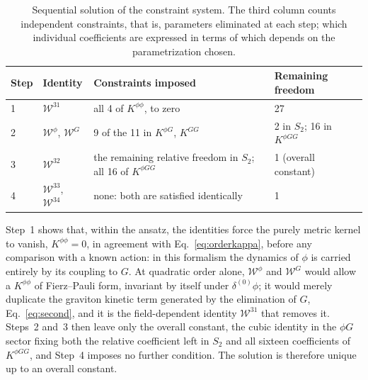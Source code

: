 \documentclass[prd,aps,preprint,nofootinbib,amsmath,amssymb,eqsecnum]{revtex4-2}
\newcommand{\W}{\mathcal{W}}
\begin{document}
\begin{table}[htb]
\centering
\setlength{\tabcolsep}{10pt}
\begin{tabular}{@{}llp{5.2cm}l@{}}
\toprule
Step & Identity & \raggedright Constraints imposed & Remaining freedom \\
\midrule
1 & $\W^{31}$ & \raggedright all 4 of $K^{\phi\phi}$, to zero & 27 \\
2 & $\W^{\phi}$, $\W^{G}$ & \raggedright 9 of the 11 in $K^{\phi G}$, $K^{GG}$ & 2 in $S_2$; 16 in $K^{\phi GG}$ \\
3 & $\W^{32}$ & \raggedright the remaining relative freedom in $S_2$; all 16 of $K^{\phi GG}$ & 1 (overall constant) \\
4 & $\W^{33}$, $\W^{34}$ & \raggedright none: both are satisfied identically & 1 \\
\bottomrule
\end{tabular}
\caption{Sequential solution of the constraint system. The third column counts
independent constraints, that is, parameters eliminated at each step; which individual
coefficients are expressed in terms of which depends on the parametrization chosen.}
\label{tab:flow}
\end{table}

Step~1 shows that, within the ansatz, the identities force the purely metric kernel to vanish,
$K^{\phi\phi}=0$, in agreement with Eq.~\eqref{eq:orderkappa}, before any comparison with a known action: in this formalism the
dynamics of $\phi$ is carried entirely by its coupling to $G$. At quadratic order alone, $\W^{\phi}$ and $\W^{G}$ would allow a $K^{\phi\phi}$ of
Fierz--Pauli form, invariant by itself under $\delta^{(0)}\phi$; it would merely duplicate the
graviton kinetic term generated by the elimination of $G$, Eq.~\eqref{eq:second}, and it is the field-dependent identity $\W^{31}$
that removes it. Steps~2 and~3 then leave only
the overall constant, the cubic identity in the $\phi G$ sector fixing both the relative
coefficient left in $S_2$ and all sixteen coefficients of $K^{\phi GG}$, and Step~4 imposes
no further condition. The solution is therefore unique up to an overall constant.
\end{document}
